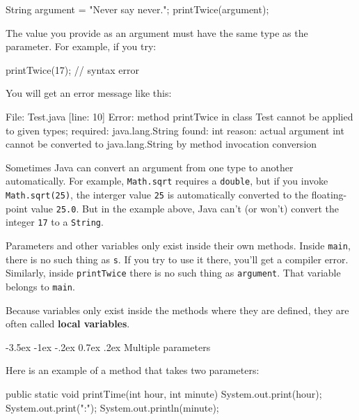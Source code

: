 \documentclass[12pt]{book}
\makeatletter
\theoremstyle{exercise}
\newcommand{\java}[1]{\verb"#1"}
\renewcommand{\section}{\@startsection{section}{1}{\z@}%
    {-3.5ex \@plus -1ex \@minus -.2ex}%
    {0.7ex \@plus.2ex}%
    {\normalfont\Large\bfseries}}
\newcommand{\java}[1]{\lstinline{#1}} %
\makeatother
\begin{document}
\begin{code}
    String argument = "Never say never.";
    printTwice(argument);
\end{code}

The value you provide as an argument must have the same type as the parameter.
For example, if you try:

\begin{code}
    printTwice(17);  // syntax error
\end{code}

You will get an error message like this:

\begin{small}
\begin{stdout}
File: Test.java  [line: 10]
Error: method printTwice in class Test cannot be applied to given types;
  required: java.lang.String
  found: int
  reason: actual argument int cannot be converted to java.lang.String
          by method invocation conversion
\end{stdout}
\end{small}

Sometimes Java can convert an argument from one type to another automatically.
For example, \java{Math.sqrt} requires a \java{double}, but if you invoke \java{Math.sqrt(25)}, the interger value \java{25} is automatically converted to the floating-point value \java{25.0}.
But in the example above, Java can't (or won't) convert the integer \java{17} to a \java{String}.

Parameters and other variables only exist inside their own methods.
Inside \java{main}, there is no such thing as \java{s}.
If you try to use it there, you'll get a compiler error.
Similarly, inside \java{printTwice} there is no such thing as \java{argument}.
That variable belongs to \java{main}.


Because variables only exist inside the methods where they are defined, they are often called {\bf local variables}.


\section{Multiple parameters}
\label{time}


Here is an example of a method that takes two parameters:

\begin{code}
    public static void printTime(int hour, int minute) {
        System.out.print(hour);
        System.out.print(":");
        System.out.println(minute);
    }
\end{code}
\end{document}
